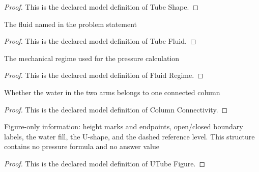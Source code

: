 \begin{proof}
  This is the declared model definition of Tube Shape.
\end{proof}
\begin{definition}
  \label{def:physics:phyx-mini-0721:phyxminiproblems-problemphyxmini0721-tubefluid}
  The fluid named in the problem statement
\end{definition}
\begin{proof}
  This is the declared model definition of Tube Fluid.
\end{proof}
\begin{definition}
  \label{def:physics:phyx-mini-0721:phyxminiproblems-problemphyxmini0721-fluidregime}
  The mechanical regime used for the pressure calculation
\end{definition}
\begin{proof}
  This is the declared model definition of Fluid Regime.
\end{proof}
\begin{definition}
  \label{def:physics:phyx-mini-0721:phyxminiproblems-problemphyxmini0721-columnconnectivity}
  Whether the water in the two arms belongs to one connected column
\end{definition}
\begin{proof}
  This is the declared model definition of Column Connectivity.
\end{proof}
\begin{definition}
  \label{def:physics:phyx-mini-0721:phyxminiproblems-problemphyxmini0721-utubefigure}
  Figure-only information: height marks and endpoints, open/closed boundary labels, the water fill, the U-shape, and the dashed reference level. This structure contains no pressure formula and no answer value
\end{definition}
\begin{proof}
  This is the declared model definition of UTube Figure.
\end{proof}
